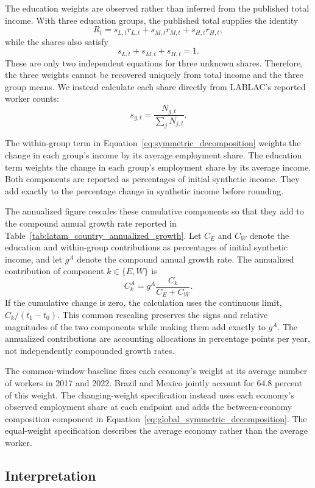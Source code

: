 \documentclass[11pt]{article}
\begin{document}
The education weights are observed rather than inferred from the published
total income. With three education groups, the published total supplies the
identity
\[
  R_t=s_{L,t}r_{L,t}+s_{M,t}r_{M,t}+s_{H,t}r_{H,t},
\]
while the shares also satisfy
\[
  s_{L,t}+s_{M,t}+s_{H,t}=1.
\]
These are only two independent equations for three unknown shares. Therefore,
the three weights cannot be recovered uniquely from total income and the
three group means. We instead calculate each share directly from LABLAC's
reported worker counts:
\[
  s_{g,t}=\frac{N_{g,t}}{\sum_j N_{j,t}}.
\]



The within-group term in
Equation~\eqref{eq:symmetric_decomposition} weights the change in each group's
income by its average employment share. The education term weights the change
in each group's employment share by its average income. Both components are
reported as percentages of initial synthetic income. They add exactly to the
percentage change in synthetic income before rounding.

The annualized figure rescales these cumulative components so that they add to
the compound annual growth rate reported in
Table~\ref{tab:latam_country_annualized_growth}. Let \(C_E\) and \(C_W\)
denote the education and within-group contributions as percentages of initial
synthetic income, and let \(g^A\) denote the compound annual growth rate. The
annualized contribution of component \(k\in\{E,W\}\) is
\[
  C_k^A=g^A\frac{C_k}{C_E+C_W}.
\]
If the cumulative change is zero, the calculation uses the continuous limit,
\(C_k/(t_1-t_0)\). This common rescaling preserves the signs and relative
magnitudes of the two components while making them add exactly to \(g^A\).
The annualized contributions are accounting allocations in percentage points
per year, not independently compounded growth rates.



The common-window baseline fixes each economy's weight at its average number
of workers in 2017 and 2022. Brazil and Mexico jointly account for 64.8
percent of this weight. The changing-weight specification instead uses each
economy's observed employment share at each endpoint and adds the
between-economy composition component in
Equation~\eqref{eq:global_symmetric_decomposition}. The equal-weight
specification describes the average economy rather than the average worker.

\subsection{Interpretation}
\end{document}
